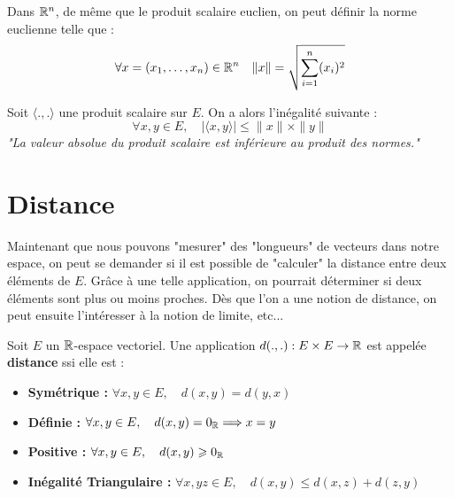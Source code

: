 \begin{example}
    Dans $\mathbb{R}^n$, de même que le produit scalaire euclien, on peut définir la norme euclienne telle que :
    \[ 
        \forall x = (x_1, \dots, x_n) \in \mathbb{R}^n \quad \|x\| = \sqrt{ \sum_{i=1}^n (x_i)^2 }
    \] 
\end{example}

\begin{prop}
    Soit $\langle .,. \rangle$ une produit scalaire sur $E$. On a alors l'inégalité suivante :
        \[ \boxed{ \forall x, y \in E, \quad | \langle x, y \rangle | \leqslant \| x\| \times \|y\| } \] 
    \emph{"La valeur absolue du produit scalaire est inférieure au produit des normes."}
\end{prop}



\section{Distance}

Maintenant que nous pouvons "mesurer" des "longueurs" de vecteurs dans notre espace, on peut se demander si il est possible 
de "calculer" la distance entre deux éléments de $E$. Grâce à une telle application, on pourrait déterminer si deux éléments sont 
plus ou moins proches. Dès que l'on a une notion de distance, on peut ensuite l'intéresser à la notion de limite, etc... 

\begin{definition}[Distance]
    Soit $E$ un $\mathbb{R}$-espace vectoriel. 
    Une application $d(.,.) : E \times E \rightarrow \mathbb{R}$ est appelée \textbf{distance} ssi elle est :
    \begin{itemize}
        \item \textbf{Symétrique : } $ \forall x,y \in E, \quad d(x,y) = d(y,x) $
        \item \textbf{Définie : } $ \forall x,y \in E, \quad d(x,y) = 0_{\mathbb{R}} \Longrightarrow x = y $
        \item \textbf{Positive : } $ \forall x,y \in E, \quad d(x,y) \geqslant 0_{\mathbb{R}} $
        \item \textbf{Inégalité Triangulaire : } $ \forall x,yz \in E, \quad d(x,y) \leqslant d(x,z) + d(z,y)$ 
    \end{itemize}
\end{definition}

